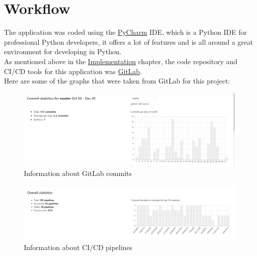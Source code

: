\section{Workflow}
The application was coded using the \href{https://www.jetbrains.com/pycharm/}{PyCharm} IDE, which is a Python IDE for professional Python developers, it offers a lot of features and is all around a great environment for developing in Python.\\
As mentioned above in the \hyperref[sec:GitLab]{Implementation} chapter, the code repository and CI/CD tools for this application was \href{https://gitlab.com/}{GitLab}.\\
Here are some of the graphs that were taken from GitLab for this project:
\begin{figure}[H]
	\includegraphics[width=\linewidth]{./Images/Appendixes/commits_graph.png}
	\caption{Information about GitLab commits}
\end{figure}
\begin{figure}[H]
	\includegraphics[width=\linewidth]{./Images/Appendixes/pipelines_graph.png}
	\caption{Information about CI/CD pipelines}
\end{figure}